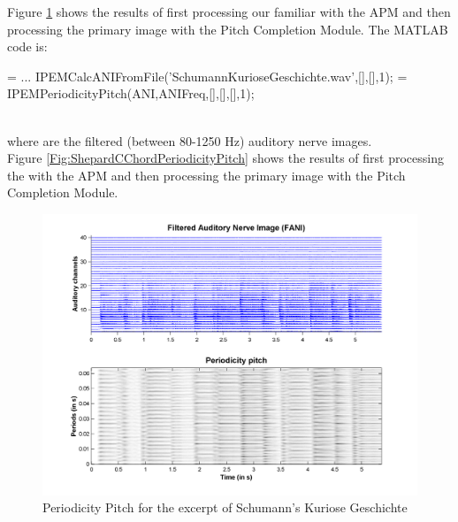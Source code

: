 Figure \ref{Fig:SchumannPeriodicityPitch} shows the results of
first processing our familiar
 with the APM and then processing
the primary image with the Pitch Completion Module. The MATLAB
code is:\\

\begin{IPEMCodeEnvironment}
 = ...
\newline IPEMCalcANIFromFile('SchumannKurioseGeschichte.wav',[],[],1);
 = IPEMPeriodicityPitch(ANI,ANIFreq,[],[],[],1);
\end{IPEMCodeEnvironment}\\

where  are the filtered (between 80-1250
Hz) auditory nerve images.\\

Figure \ref{Fig:ShepardCChordPeriodicityPitch} shows the results
of first processing the  with the APM and then processing
the primary image with the Pitch Completion Module.

\begin{figure}[h]
    \centering
    \includegraphics[width=\IPEMDefaultFigureWidth]{Graphics/SchumannPeriodicityPitch}
    \caption{Periodicity Pitch for the excerpt of Schumann's Kuriose Geschichte}
    \label{Fig:SchumannPeriodicityPitch}
\end{figure}

